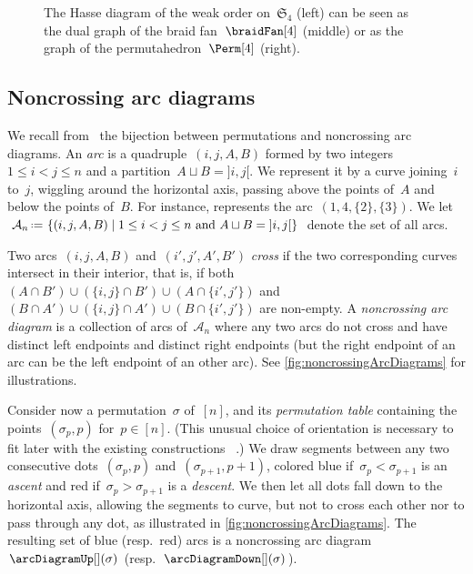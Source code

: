 \documentclass{amsart}
\theoremstyle{definition}
\newcommand{\f}[1]{{\mathfrak{#1}}} %
\newcommand{\set}[2]{\left\{ #1 \;\middle|\; #2 \right\}} %
\newcommand{\eqdef}{\mbox{\,\raisebox{0.2ex}{\scriptsize\ensuremath{\mathrm:}}\ensuremath{=}\,}} %
\newcommand{\darkblue}{\color{darkblue}} %
\newcommand{\defn}[1]{\textsl{\darkblue #1}} %
\newcommand{\arcs}{{\mathcal{A}}} %
\begin{document}
\begin{figure}
	\caption{The Hasse diagram of the weak order on~$\f{S}_4$ (left) can be seen as the dual graph of the braid fan~$\braidFan[4]$ (middle) or as the graph of the permutahedron~$\Perm[4]$ (right). \cite[Fig.~1]{PilaudSantos-quotientopes}}
	\label{fig:weakOrder4}
\end{figure}


\subsection{Noncrossing arc diagrams}
\label{subsec:noncrossingArcDiagrams}

We recall from~\cite{Reading-arcDiagrams} the bijection between permutations and noncrossing arc diagrams.
An \defn{arc} is a quadruple~$(i, j, A, B)$ formed by two integers $1 \le i < j \le n$ and a partition~${A \sqcup B = {]i,j[}}$.
We represent it by a curve joining~$i$ to~$j$, wiggling around the horizontal axis, passing above the points of~$A$ and below the points of~$B$.
For instance,  represents the arc~$(1,4,\{2\},\{3\})$.
We let~$\arcs_n \eqdef \set{(i, j, A, B)}{1 \le i < j \le n \text{ and } A \sqcup B = {]i,j[}}$ denote the set of all arcs.

Two arcs~$(i, j, A, B)$ and~$(i', j', A', B')$ \defn{cross} if the two corresponding curves intersect in their interior, that is, if both~$(A \cap B') \cup (\{i,j\} \cap B') \cup (A \cap \{i',j'\})$ and~$(B \cap A') \cup (\{i,j\} \cap A') \cup (B \cap \{i',j'\})$ are non-empty.
A \defn{noncrossing arc diagram} is a collection of arcs of~$\arcs_n$ where any two arcs do not cross and have distinct left endpoints and distinct right endpoints (but the right endpoint of an arc can be the left endpoint of an other arc).
See \cref{fig:noncrossingArcDiagrams} for illustrations.

Consider now a permutation~$\sigma$ of~$[n]$, and its \defn{permutation table} containing the points~$(\sigma_p, p)$ for~$p \in [n]$.
(This unusual choice of orientation is necessary to fit later with the existing constructions ~\cite{LodayRonco, HivertNovelliThibon-algebraBinarySearchTrees, ChatelPilaud, PilaudPons-permutrees}.)
We draw segments between any two consecutive dots~$(\sigma_p, p)$ and~$(\sigma_{p+1}, p+1)$, colored blue if~$\sigma_p < \sigma_{p+1}$ is an \defn{ascent} and red if~$\sigma_p > \sigma_{p+1}$ is a \defn{descent}.
We then let all dots fall down to the horizontal axis, allowing the segments to curve, but not to cross each other nor to pass through any dot, as illustrated in \cref{fig:noncrossingArcDiagrams}.
The resulting set of blue (resp.~red) arcs is a noncrossing arc diagram~$\arcDiagramUp[](\sigma)$ (resp.~$\arcDiagramDown[](\sigma)$).
\end{document}
